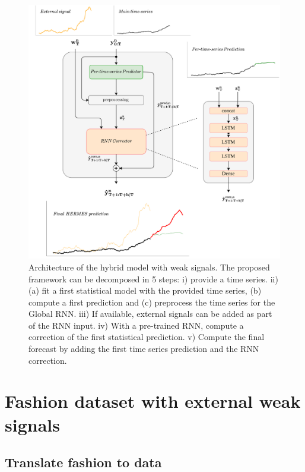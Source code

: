 \documentclass[review]{elsarticle}
\begin{document}
\begin{figure}
  \centering
    \includegraphics[width=1\linewidth]{paper_final_framework.png}
  \caption{Architecture of the hybrid model with weak signals. The proposed framework can be decomposed in 5 steps: i) provide a time series. ii) (a) fit a first statistical model with the provided time series, (b) compute a first prediction and (c) preprocess the time series for the Global RNN. iii) If available, external signals can be added as part of the RNN input. iv) With a pre-trained RNN, compute a correction of the first statistical prediction. v) Compute the final forecast by adding the first time series prediction and the RNN correction.} 
\label{fig:architecture}
\end{figure}

\section{Fashion dataset with external weak signals}
\label{sec:dataset}

\subsection{Translate fashion to data}
\label{sec:dataset:a}
\end{document}
